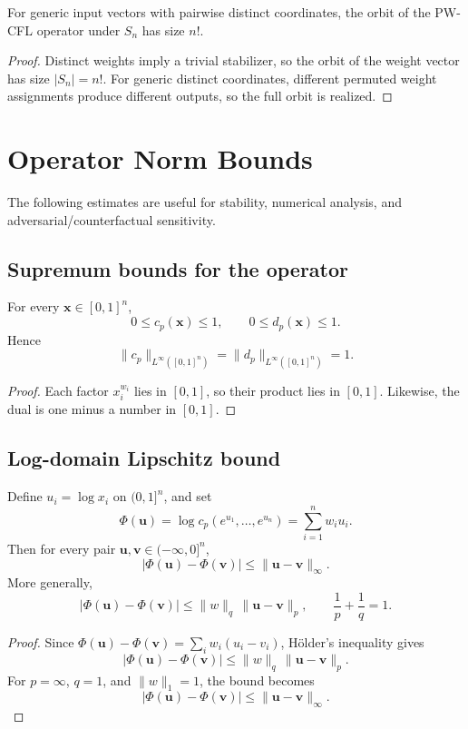 \documentclass[11pt]{article}
\begin{document}
\begin{corollary}
For generic input vectors with pairwise distinct coordinates, the orbit of the PW-CFL operator under $S_n$ has size $n!$.
\end{corollary}
\begin{proof}
Distinct weights imply a trivial stabilizer, so the orbit of the weight vector has size $|S_n|=n!$. For generic distinct coordinates, different permuted weight assignments produce different outputs, so the full orbit is realized.
\end{proof}

\section{Operator Norm Bounds}
The following estimates are useful for stability, numerical analysis, and adversarial/counterfactual sensitivity.

\subsection{Supremum bounds for the operator}
\begin{proposition}
For every $\mathbf{x}\in[0,1]^n$,
\[
0 \le c_p(\mathbf{x}) \le 1, \qquad 0 \le d_p(\mathbf{x}) \le 1.
\]
Hence
\[
\|c_p\|_{L^\infty([0,1]^n)} = \|d_p\|_{L^\infty([0,1]^n)} = 1.
\]
\end{proposition}
\begin{proof}
Each factor $x_i^{w_i}$ lies in $[0,1]$, so their product lies in $[0,1]$. Likewise, the dual is one minus a number in $[0,1]$.
\end{proof}

\subsection{Log-domain Lipschitz bound}
\begin{proposition}
Define $u_i = \log x_i$ on $(0,1]^n$, and set
\[
\Phi(\mathbf{u}) = \log c_p(e^{u_1},\dots,e^{u_n}) = \sum_{i=1}^n w_i u_i.
\]
Then for every pair $\mathbf{u},\mathbf{v}\in(-\infty,0]^n$,
\[
|\Phi(\mathbf{u})-\Phi(\mathbf{v})| \le \|\mathbf{u}-\mathbf{v}\|_\infty.
\]
More generally,
\[
|\Phi(\mathbf{u})-\Phi(\mathbf{v})| \le \|w\|_q\,\|\mathbf{u}-\mathbf{v}\|_p,
\qquad \frac1p+\frac1q=1.
\]
\end{proposition}
\begin{proof}
Since $\Phi(\mathbf{u})-\Phi(\mathbf{v}) = \sum_i w_i(u_i-v_i)$, Hölder's inequality gives
\[
|\Phi(\mathbf{u})-\Phi(\mathbf{v})| \le \|w\|_q\,\|\mathbf{u}-\mathbf{v}\|_p.
\]
For $p=\infty$, $q=1$, and $\|w\|_1=1$, the bound becomes
\[
|\Phi(\mathbf{u})-\Phi(\mathbf{v})| \le \|\mathbf{u}-\mathbf{v}\|_\infty.
\]
\end{proof}
\end{document}
